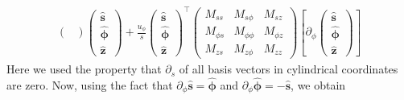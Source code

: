 \[\begin{aligned}
\begin{pmatrix}
    \end{pmatrix} \begin{pmatrix}\hat{\mathbf{s}} \\ \hat{\bm{\phi}} \\ \hat{\mathbf{z}}\end{pmatrix} 
    + \frac{u_\phi}{s} \begin{pmatrix}\hat{\mathbf{s}} \\ \hat{\bm{\phi}} \\ \hat{\mathbf{z}}\end{pmatrix}^\top \begin{pmatrix}
        M_{ss} & M_{s\phi} & M_{sz} \\ 
        M_{\phi s} & M_{\phi\phi} & M_{\phi z} \\ 
        M_{zs} & M_{z\phi} & M_{zz}
    \end{pmatrix} \left[\partial_\phi\begin{pmatrix}\hat{\mathbf{s}} \\ \hat{\bm{\phi}} \\ \hat{\mathbf{z}}\end{pmatrix}\right]
\end{aligned}\]
%
Here we used the property that $\partial_s$ of all basis vectors in cylindrical coordinates are zero. Now, using the fact that $\partial_\phi \hat{\mathbf{s}} = \hat{\bm{\phi}}$ and $\partial_\phi \hat{\bm{\phi}} = - \hat{\mathbf{s}}$, we obtain
%
